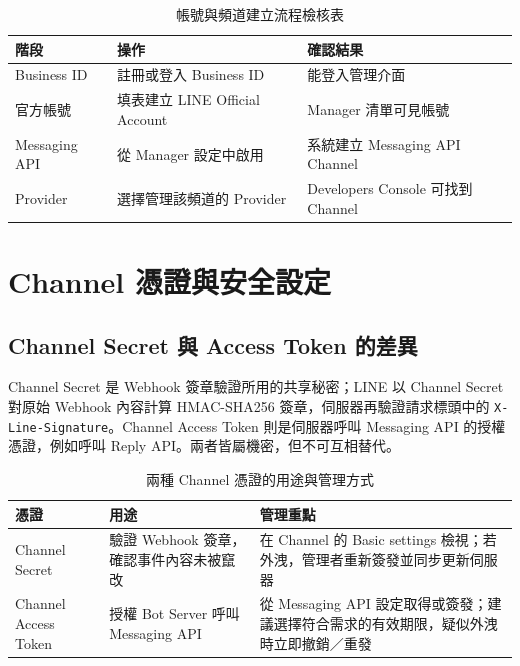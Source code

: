 \documentclass[a4paper,12pt]{report}
\begin{document}
\begin{table}[htbp]
\centering
\caption{帳號與頻道建立流程檢核表}
\label{tab:registration}
\begin{tabular}{|p{}|p{}|p{}|}
\hline
\textbf{階段} & \textbf{操作} & \textbf{確認結果} \\
\hline
Business ID & 註冊或登入 Business ID & 能登入管理介面 \\
\hline
官方帳號 & 填表建立 LINE Official Account & Manager 清單可見帳號 \\
\hline
Messaging API & 從 Manager 設定中啟用 & 系統建立 Messaging API Channel \\
\hline
Provider & 選擇管理該頻道的 Provider & Developers Console 可找到 Channel \\
\hline
\end{tabular}
\end{table}

\chapter{Channel 憑證與安全設定}

\section{Channel Secret 與 Access Token 的差異}

Channel Secret 是 Webhook 簽章驗證所用的共享秘密；LINE 以 Channel Secret 對原始 Webhook 內容計算 HMAC-SHA256 簽章，伺服器再驗證請求標頭中的 \texttt{X-Line-Signature}。Channel Access Token 則是伺服器呼叫 Messaging API 的授權憑證，例如呼叫 Reply API。兩者皆屬機密，但不可互相替代。

\begin{table}[htbp]
\centering
\caption{兩種 Channel 憑證的用途與管理方式}
\label{tab:credentials}
\begin{tabular}{|p{}|p{}|p{}|}
\hline
\textbf{憑證} & \textbf{用途} & \textbf{管理重點} \\
\hline
Channel Secret & 驗證 Webhook 簽章，確認事件內容未被竄改 & 在 Channel 的 Basic settings 檢視；若外洩，管理者重新簽發並同步更新伺服器 \\
\hline
Channel Access Token & 授權 Bot Server 呼叫 Messaging API & 從 Messaging API 設定取得或簽發；建議選擇符合需求的有效期限，疑似外洩時立即撤銷／重發 \\
\hline
\end{tabular}
\end{table}
\end{document}
